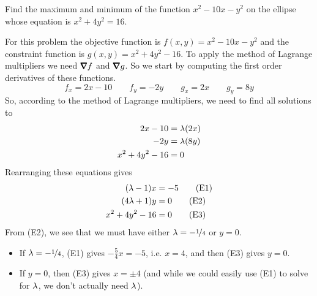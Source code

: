 \begin{eg}\label{eg LagrangeA}
Find the maximum and minimum of the function $x^2-10x-y^2$ on the 
ellipse whose equation is $x^2+4y^2= 16$.


\soln For this problem the objective function is $f(x,y) = x^2-10x-y^2$
and the constraint function is $g(x,y)=x^2+4y^2-16$. 
To apply the method of Lagrange multipliers we need $\vnabla f$
and $\vnabla g$. So we start by computing the first order derivatives
of these functions.
\begin{equation*}
f_x=2x-10\qquad
f_y=-2y\qquad
g_x=2x\qquad
g_y=8y
\end{equation*}
So, according to the method of Lagrange multipliers, we need to find all solutions to
\begin{align*}
2x-10&=\lambda (2x) \\
-2y&=\lambda (8y)\\
x^2+4y^2-16&=0
\end{align*}
Rearranging these equations gives
\begin{align*}
     (\lambda-1)x&=-5 \tag{E1}\\
     (4\lambda+1)y&=0 \tag{E2}\\
   x^2+4y^2-16&=0   \tag{E3}
\end{align*}
From (E2), we see that we must have either 
$\lambda=-\nicefrac{1}{4}$ or $y=0$.
\begin{itemize}
\item If $\lambda=-\nicefrac{1}{4}$, (E1) gives 
$-\frac{5}{4}x=-5$, i.e. $x=4$, and then
(E3) gives $y=0$.

\item If $y=0$, then (E3) gives $x=\pm 4$ (and while we could easily 
use (E1) to solve for $\lambda$, we don't actually need $\lambda$).  


\end{itemize}
\end{eg}
